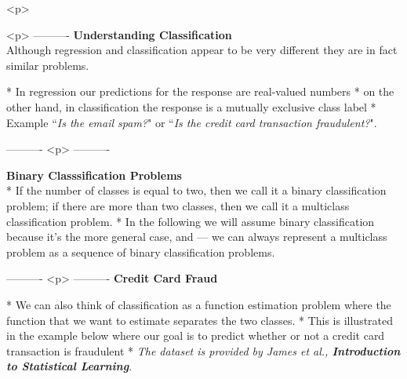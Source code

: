 %
%
%	
%	
%
<p>

<p>
----------%
\newpage
 \textbf{Understanding Classification}\\
Although regression and classification appear to be very different they are in fact similar problems.


*   In regression our predictions for the response are real-valued numbers
*   on the other hand, in classification the response is a mutually exclusive class label 
*   Example ``\textit{Is the email spam?}" or ``\textit{Is the credit card transaction fraudulent?}".


----------%
<p>
----------%
\newpage
 	
 	\textbf{Binary Classsification Problems}\\
 	
*   If the number of classes is equal to two, then we call it a binary classification problem; if there are more than two classes, then we call it a multiclass classification problem.
*    In the following we will assume binary classification because it’s the more general case, and — we can always represent a multiclass problem as a sequence of binary classification problems.


----------%
<p>
----------%
\newpage
\textbf{Credit Card Fraud}

*   We can also think of classification as a function estimation problem where the function that we want to estimate separates the two classes. 
*   This is illustrated in the example below where our goal is to predict whether or not a credit card transaction is fraudulent
*   \textit{The dataset is provided by James et al., \textbf{Introduction to Statistical Learning}}.


